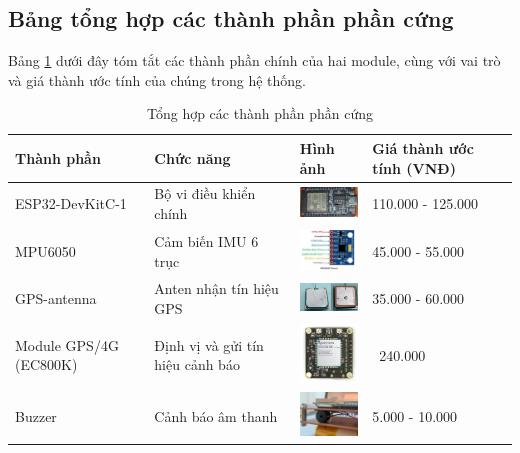 \subsection{Bảng tổng hợp các thành phần phần cứng}
\label{ssec:component_summary}

Bảng \ref{tab:hardware_components} dưới đây tóm tắt các thành phần chính của hai module, cùng với vai trò và giá thành ước tính của chúng trong hệ thống.

\begin{table}[H]
 	\centering
 	\caption{Tổng hợp các thành phần phần cứng}
 	\label{tab:hardware_components}
 	\begin{tabular}{|l|p{5cm}|p{2cm}|l|}
 	 	\hline
 	 	\textbf{Thành phần} & \textbf{Chức năng} & \textbf{Hình ảnh} & \textbf{Giá thành ước tính (VNĐ)} \\
 	 	\hline
 	 	ESP32-DevKitC-1 & Bộ vi điều khiển chính & \includegraphics[width=2cm]{figures/real_esp32_c1.png} & 110.000 - 125.000 \\
 	 	\hline
 	 	MPU6050 & Cảm biến IMU 6 trục & \includegraphics[width=2cm]{figures/real_mpu6050.jpg} & 45.000 - 55.000 \\
 	 	\hline
 	 	GPS-antenna & Anten nhận tín hiệu GPS & \includegraphics[width=2cm]{figures/real_gps_antenna.png} & 35.000 - 60.000 \\
 	 	\hline
 	 	Module GPS/4G (EC800K) & Định vị và gửi tín hiệu cảnh báo & \includegraphics[width=2cm]{figures/real_ec800k.jpg} & ~240.000 \\
 	 	\hline
 	 	Buzzer & Cảnh báo âm thanh & \includegraphics[width=2cm]{figures/real_buzzer.jpg} & 5.000 - 10.000 \\

\end{tabular}
\end{table}
